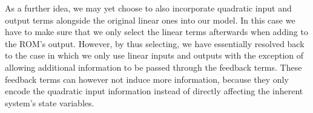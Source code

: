 

As a further idea, we may yet choose to also incorporate quadratic input and output terms alongside the original linear ones into our model.
In this case we have to make sure that we only select the linear terms afterwards when adding to the \ac{ROM}'s output.
However, by thus selecting, we have essentially resolved back to the case in which we only use linear inputs and outputs with the exception of allowing additional information to be passed through the feedback terms.
These feedback terms can however not induce more information, because they only encode the quadratic input information instead of directly affecting the inherent system's state variables.

